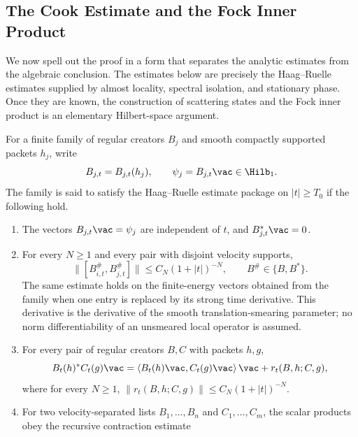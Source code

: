 \subsection{The Cook Estimate and the Fock Inner Product}

We now spell out the proof in a form that separates the analytic estimates
from the algebraic conclusion.  The estimates below are precisely the
Haag--Ruelle estimates supplied by almost locality, spectral isolation, and
stationary phase.  Once they are known, the construction of scattering states
and the Fock inner product is an elementary Hilbert-space argument.

\begin{definition}
\label{def:haag-ruelle-estimate-package}
For a finite family of regular creators \(B_j\) and smooth compactly
supported packets \(h_j\), write
\[
  B_{j,t}=B_{j,t}(h_j),
  \qquad
  \psi_j=B_{j,t}\vac\in\Hilb_1 .
\]
The family is said to satisfy the Haag--Ruelle estimate package on
\(|t|\ge T_0\) if the following hold.
\begin{enumerate}
  \item The vectors \(B_{j,t}\vac=\psi_j\) are independent of \(t\), and
  \(B_{j,t}^*\vac=0\).
  \item For every \(N\ge1\) and every pair with disjoint velocity supports,
  \begin{equation}
    \|[B_{i,t}^{\#},B_{j,t}^{\#}]\|
    \le C_N(1+|t|)^{-N},
    \qquad B^\#\in\{B,B^*\}.
    \label{eq:hr-estimate-package-commutator}
  \end{equation}
  The same estimate holds on the finite-energy vectors obtained from the
  family when one entry is replaced by its strong time derivative.  This
  derivative is the derivative of the smooth translation-smearing parameter;
  no norm differentiability of an unsmeared local operator is assumed.
  \item For every pair of regular creators \(B,C\) with packets \(h,g\),
  \begin{equation}
    B_t(h)^*C_t(g)\vac
    =
    \langle B_t(h)\vac,C_t(g)\vac\rangle\,\vac
    +
    r_t(B,h;C,g),
    \label{eq:hr-estimate-package-contraction}
  \end{equation}
  where for every \(N\ge1\),
  \(\|r_t(B,h;C,g)\|\le C_N(1+|t|)^{-N}\).
  \item For two velocity-separated lists
  \(B_1,\ldots,B_n\) and \(C_1,\ldots,C_m\), the scalar products obey the
  recursive contraction estimate
  \begin{equation}

\end{equation}
\end{enumerate}
\end{definition}
